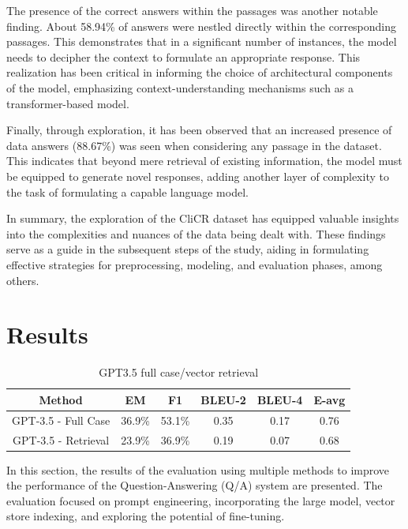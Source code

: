 \documentclass[onecolumn, conference]{IEEEtran}
\begin{document}
The presence of the correct answers within the passages was another notable finding. About 58.94\% of answers were nestled directly within the corresponding passages. This demonstrates that in a significant number of instances, the model needs to decipher the context to formulate an appropriate response. This realization has been critical in informing the choice of architectural components of the model, emphasizing context-understanding mechanisms such as a transformer-based model.

Finally, through exploration, it has been observed that an increased presence of data answers (88.67\%) was seen when considering any passage in the dataset. This indicates that beyond mere retrieval of existing information, the model must be equipped to generate novel responses, adding another layer of complexity to the task of formulating a capable language model.

In summary, the exploration of the CliCR dataset has equipped valuable insights into the complexities and nuances of the data being dealt with. These findings serve as a guide in the subsequent steps of the study, aiding in formulating effective strategies for preprocessing, modeling, and evaluation phases, among others.

\section{Results}

\begin{table}
  \caption{GPT3.5 full case/vector retrieval}
  \centering
  \begin{tabular}{|c|c|c|c|c|c|} \hline
    \textbf{Method}     & \textbf{EM} & \textbf{F1} & \textbf{BLEU-2} & \textbf{BLEU-4} & \textbf{E-avg} \\ \hline
    GPT-3.5 - Full Case & 36.9\%      & 53.1\%      & 0.35            & 0.17            & 0.76           \\ \hline
    GPT-3.5 - Retrieval & 23.9\%      & 36.9\%      & 0.19            & 0.07            & 0.68           \\ \hline
  \end{tabular}
  \label{tab:fc_vec}
\end{table}

In this section, the results of the evaluation using multiple methods to improve the performance of the Question-Answering (Q/A) system are presented. The evaluation focused on prompt engineering, incorporating the large model, vector store indexing, and exploring the potential of fine-tuning.
\end{document}
